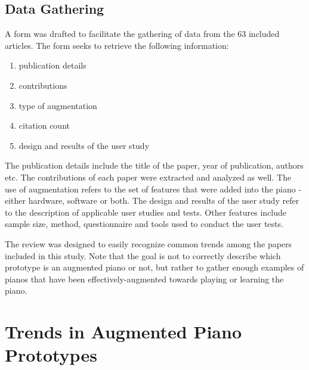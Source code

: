 \documentclass[sigchi, review]{acmart}
\begin{document}
\subsection{Data Gathering}
\label{subsec: gathering}
A form was drafted to facilitate the gathering of data from the 63 included articles. The form seeks to retrieve the following information: 
\begin{enumerate}
    \item publication details
    \item contributions
    \item type of augmentation
    \item citation count
    \item design and results of the user study
\end{enumerate}
The publication details include the title of the paper, year of publication, authors etc. The contributions of each paper were extracted and analyzed as well. The use of augmentation refers to the set of features that were added into the piano - either hardware, software or both. The design and results of the user study refer to the description of applicable user studies and tests. Other features include sample size, method, questionnaire and tools used to conduct the user tests.

The review was designed to easily recognize common trends among the papers included in this study. Note that the goal is not to correctly describe which prototype is an augmented piano or not, but rather to gather enough examples of pianos that have been effectively-augmented towards playing or learning the piano.  

\section{Trends in Augmented Piano Prototypes}
\label{sec: trends}

\end{document}
